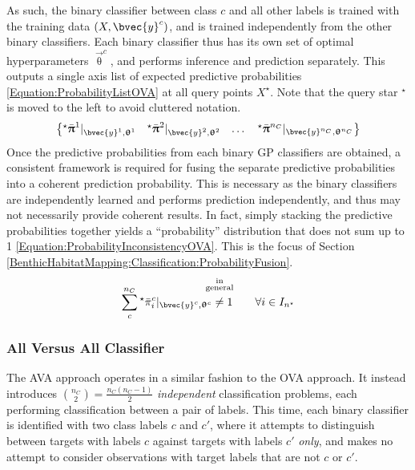 				As such, the binary classifier between class $c$ and all other labels is trained with the training data $(X, \bvec{y}^{c})$, and is trained independently from the other binary classifiers. Each binary classifier thus has its own set of optimal hyperparameters $\vec{\uptheta}^{c}$, and performs inference and prediction separately. This outputs a single axis list of expected predictive probabilities \eqref{Equation:ProbabilityListOVA} at all query points $X^{\star}$. Note that the query star $^{\star}$ is moved to the left to avoid cluttered notation. \begin{equation}
					\begin{Bmatrix*}
						{^{\star}}\bar{\vec{\uppi}}^{1} |_{\bvec{y}^{1}, \vec{\uptheta}^{1}} & {^{\star}}\bar{\vec{\uppi}}^{2} |_{\bvec{y}^{2}, \vec{\uptheta}^{2}} & \dots & {^{\star}}\bar{\vec{\uppi}}^{n_{C}} |_{\bvec{y}^{n_{C}}, \vec{\uptheta}^{n_{C}}}
					\end{Bmatrix*} 
				\label{Equation:ProbabilityListOVA}
				\end{equation} Once the predictive probabilities from each binary GP classifiers are obtained, a consistent framework is required for fusing the separate predictive probabilities into a coherent prediction probability. This is necessary as the binary classifiers are independently learned and performs prediction independently, and thus may not necessarily provide coherent results. In fact, simply stacking the predictive probabilities together yields a ``probability'' distribution that does not sum up to 1 \eqref{Equation:ProbabilityInconsistencyOVA}. This is the focus of Section \ref{BenthicHabitatMapping:Classification:ProbabilityFusion}. \begin{equation}
					\sum_{c}^{n_{C}} {^{\star}}\bar{\pi}^{c}_{i} |_{\bvec{y}^{c}, \vec{\uptheta}^{c}} \stackrel{\mathclap{\substack{\text{in} \\ \text{general} \\ \quad }}}{\neq} 1 \qquad \forall i \in I_{n^{\star}}
				\label{Equation:ProbabilityInconsistencyOVA}
				\end{equation}
				
			\subsubsection{All Versus All Classifier}
			\label{BenthicHabitatMapping:Classification:MulticlassClassification:AVA}
			
				The AVA approach operates in a similar fashion to the OVA approach. It instead introduces ${n_{C} \choose 2} = \frac{n_{C} (n_{C} - 1)}{2}$ \textit{independent} classification problems, each performing classification between a pair of labels. This time, each binary classifier is identified with two class labels $c$ and $c'$, where it attempts to distinguish between targets with labels $c$ against targets with labels $c'$ \textit{only}, and makes no attempt to consider observations with target labels that are not $c$ or $c'$. 
				

